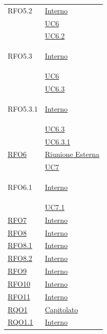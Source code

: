 \begin{longtable}{|>{\centering}m{5cm}|m{5cm}<{\centering}|}
\hypertarget{RFO5.2}{RFO5.2} &  \hyperlink{Interno}{Interno}\\
& \hyperref[UC6]{UC6}\\
& \hyperref[UC6.2]{UC6.2}\\ \hline

\hypertarget{RFO5.3}{RFO5.3} &  \hyperlink{Interno}{Interno}\\
& \hyperref[UC6]{UC6}\\
& \hyperref[UC6.3]{UC6.3}\\ \hline

\hypertarget{RFO5.3.1}{RFO5.3.1} &  \hyperlink{Interno}{Interno}\\
& \hyperref[UC6.3]{UC6.3}\\
& \hyperref[UC6.3.1]{UC6.3.1}\\ \hline

\hyperlink{RFO6}{RFO6} & \hyperlink{Riunione Esterna}{Riunione Esterna}\\
& \hyperref[UC7]{UC7}\\ \hline

\hypertarget{RFO6.1}{RFO6.1} & \hyperlink{Interno}{Interno}\\
& \hyperref[UC7.1]{UC7.1}\\ \hline

\hyperlink{RFO7}{RFO7} & \hyperlink{Interno}{Interno}\\\hline

\hyperlink{RFO8}{RFO8} & \hyperlink{Interno}{Interno}\\\hline

\hyperlink{RFO8.1}{RFO8.1} & \hyperlink{Interno}{Interno}\\\hline

\hyperlink{RFO8.2}{RFO8.2} & \hyperlink{Interno}{Interno}\\\hline

\hyperlink{RFO9}{RFO9} & \hyperlink{Interno}{Interno}\\\hline

\hyperlink{RFO10}{RFO10} & \hyperlink{Interno}{Interno}\\\hline

\hyperlink{RFO11}{RFO11} & \hyperlink{Interno}{Interno}\\\hline

\hyperlink{RQO1}{RQO1} & \hyperlink{Capitolato}{Capitolato}\\ \hline

\hyperlink{RQO1.1}{RQO1.1} & \hyperlink{Interno}{Interno}\\ \hline


\end{longtable}
